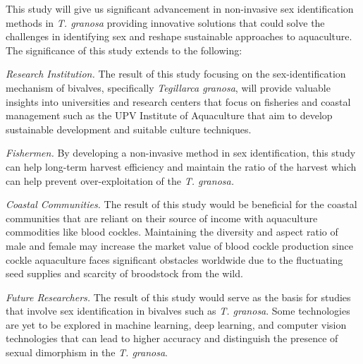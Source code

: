 This study will give us significant advancement in non-invasive sex identification methods in \textit{T. granosa} providing innovative solutions that could solve the challenges in identifying sex and reshape sustainable approaches to aquaculture. The significance of this study extends to the following:

 \textit{Research Institution.} The result of this study focusing on the sex-identification mechanism of bivalves, specifically \textit{Tegillarca granosa}, will provide valuable insights into universities and research centers that focus on fisheries and coastal management such as the UPV Institute of Aquaculture that aim to develop sustainable development and suitable culture techniques.

 \textit{Fishermen.} By developing a non-invasive method in sex identification, this study can help long-term harvest efficiency and maintain the ratio of the harvest which can help prevent over-exploitation of the \textit{T. granosa.}

 \textit{Coastal Communities.} The result of this study would be beneficial for the coastal communities that are reliant on their source of income with aquaculture commodities like blood cockles. Maintaining the diversity and aspect ratio of male and female may increase the market value of blood cockle production since cockle aquaculture faces significant obstacles worldwide due to the fluctuating seed supplies and scarcity of broodstock from the wild. 

 \textit{Future Researchers.} The result of this study would serve as the basis for studies that involve sex identification in bivalves such as \textit{T. granosa}. Some technologies are yet to be explored in machine learning, deep learning, and computer vision technologies that can lead to higher accuracy and distinguish the presence of sexual dimorphism in the \textit{T. granosa}.


